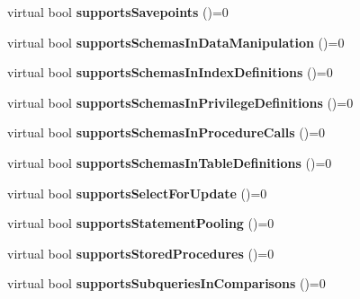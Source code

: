 \begin{DoxyCompactItemize}
virtual bool {\bfseries supports\+Savepoints} ()=0
\item 
\hypertarget{classsql_1_1_database_meta_data_ac8e5c8986cb2c03c29fdda9b64a35909}{}\label{classsql_1_1_database_meta_data_ac8e5c8986cb2c03c29fdda9b64a35909} 
virtual bool {\bfseries supports\+Schemas\+In\+Data\+Manipulation} ()=0
\item 
\hypertarget{classsql_1_1_database_meta_data_a696fcce24ee795daaaf3895518b40d9b}{}\label{classsql_1_1_database_meta_data_a696fcce24ee795daaaf3895518b40d9b} 
virtual bool {\bfseries supports\+Schemas\+In\+Index\+Definitions} ()=0
\item 
\hypertarget{classsql_1_1_database_meta_data_a111d525ae0e0f94bb846adfca24aa422}{}\label{classsql_1_1_database_meta_data_a111d525ae0e0f94bb846adfca24aa422} 
virtual bool {\bfseries supports\+Schemas\+In\+Privilege\+Definitions} ()=0
\item 
\hypertarget{classsql_1_1_database_meta_data_a6053c9a5d7f7f88e42846b7f70d0469b}{}\label{classsql_1_1_database_meta_data_a6053c9a5d7f7f88e42846b7f70d0469b} 
virtual bool {\bfseries supports\+Schemas\+In\+Procedure\+Calls} ()=0
\item 
\hypertarget{classsql_1_1_database_meta_data_a3419607425db243a55b3f478e955f51d}{}\label{classsql_1_1_database_meta_data_a3419607425db243a55b3f478e955f51d} 
virtual bool {\bfseries supports\+Schemas\+In\+Table\+Definitions} ()=0
\item 
\hypertarget{classsql_1_1_database_meta_data_aef22fdd259eb499648a27646fa936606}{}\label{classsql_1_1_database_meta_data_aef22fdd259eb499648a27646fa936606} 
virtual bool {\bfseries supports\+Select\+For\+Update} ()=0
\item 
\hypertarget{classsql_1_1_database_meta_data_a918e4b10684e98660642d079089a9892}{}\label{classsql_1_1_database_meta_data_a918e4b10684e98660642d079089a9892} 
virtual bool {\bfseries supports\+Statement\+Pooling} ()=0
\item 
\hypertarget{classsql_1_1_database_meta_data_a90ecb0d24932c62de607adaa7ce77a2b}{}\label{classsql_1_1_database_meta_data_a90ecb0d24932c62de607adaa7ce77a2b} 
virtual bool {\bfseries supports\+Stored\+Procedures} ()=0
\item 
\hypertarget{classsql_1_1_database_meta_data_a5aece699807876a7031f8992831c09a5}{}\label{classsql_1_1_database_meta_data_a5aece699807876a7031f8992831c09a5} 
virtual bool {\bfseries supports\+Subqueries\+In\+Comparisons} ()=0
\item 
\hypertarget{classsql_1_1_database_meta_data_afaf31532b7f8fa83622b59de70e1a81f}{}\label{classsql_1_1_database_meta_data_afaf31532b7f8fa83622b59de70e1a81f} 

\end{DoxyCompactItemize}
